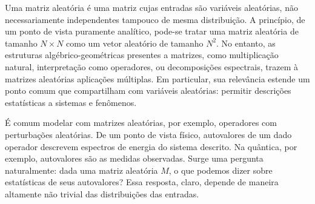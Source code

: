 Uma matriz aleatória é uma matriz cujas entradas são variáveis aleatórias, não necessariamente independentes tampouco de mesma distribuição. A princípio, de um ponto de vista puramente analítico, pode-se tratar uma matriz aleatória de tamanho $N\times N$ como um vetor aleatório de tamanho $N^2$. No entanto, as estruturas algébrico-geométricas presentes a matrizes, como multiplicação natural, interpretação como operadores, ou decomposições espectrais, trazem à matrizes aleatórias aplicações múltiplas. Em particular, sua relevância estende um ponto comum que compartilham com variáveis aleatórias: permitir descrições estatísticas a sistemas e fenômenos. 
	
É comum modelar com matrizes aleatórias, por exemplo, operadores com perturbações aleatórias. De um ponto de vista físico, autovalores de um dado operador descrevem espectros de energia do sistema descrito. Na quântica, por exemplo, autovalores são as medidas observadas. Surge uma pergunta naturalmente: dada uma matriz aleatória $M$, o que podemos dizer sobre estatísticas de seus autovalores? Essa resposta, claro, depende de maneira altamente não trivial das distribuições das entradas.  
